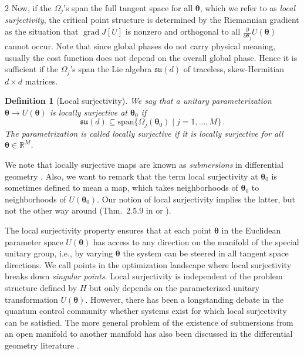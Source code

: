 \documentclass{article}
\renewcommand{\vec}[1]{\ensuremath{\boldsymbol{#1}}}
\newtheorem{definition}{Definition}
\begin{document}
\begin{multicols}{2}
Now, if the $\Omega_{j}$'s span the full tangent space for all $\vec{\theta}$, which we refer to as \emph{local surjectivity}, the critical point structure is determined by the Riemannian gradient as the situation that $\operatorname{grad}J[U]$ is nonzero and orthogonal to all $\frac{\partial}{\partial \theta_{j}}U(\vec{\theta})$ cannot occur.
Note that since global phases do not carry physical meaning, usually the cost function does not depend on the overall global phase.
Hence it is sufficient if the $\Omega_{j}$'s span the Lie algebra \(\mathfrak{su}(d)\) of traceless, skew-Hermitian \(d \times d\) matrices.
\begin{definition}[Local surjectivity]
\label{def:local_surjectivity}
We say that a unitary parameterization $\vec{\theta} \to U(\vec{\theta})$ is locally surjective at $\vec{\theta}_0$ if
\begin{equation}
    \mathfrak{su}(d) \subseteq \mathrm{span}\{\Omega_j(\vec{\theta}_0) \mid j=1,...,M\}\,. 
\end{equation}
The parametrization is called \emph{locally surjective} 
if it is \emph{locally surjective} for all $\vec{\theta} \in \mathds{R}^M$.
\end{definition}
\noindent
We note that locally surjective maps are known as \emph{submersions} in differential geometry \cite{lee_introduction_2013}. 
Also, we want to remark that the term local surjectivity at $\vec{\theta}_0$ is sometimes defined to mean a map, which takes neighborhoods of $\vec{\theta}_0$ to neighborhoods of $U(\vec{\theta}_0)$. 
Our notion of local surjectivity implies the latter, but not the 
other way around (Thm.~2.5.9 in \cite{AMR88} or \cite{grasse_higher-order_1986}).

The local surjectivity property ensures that at each point $\vec{\theta}$ in the Euclidean parameter space $U(\vec{\theta})$ has access to any direction on the manifold of the special unitary group, i.e., by varying $\vec{\theta}$ the system can be steered in all tangent space directions.
We call points in the optimization landscape where local surjectivity breaks down \emph{singular points}. Local surjectivity is independent of the problem structure defined by $H$ but only depends on the parameterized unitary transformation $U(\vec{\theta})$. However, there has been a longstanding debate in the quantum control community whether systems exist for which local surjectivity can be satisfied. The more general problem of the existence of submersions from an open manifold to another manifold has also been discussed in the differential geometry literature \cite{phillips_submersions_1967}. 


\end{multicols}
\end{document}
